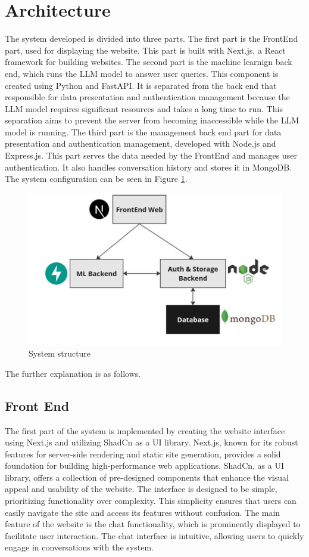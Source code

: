 \section{Architecture}
\label{sec:arsitektur}
The system developed is divided into three parts. The first part is the FrontEnd part, used for displaying the website. This part is built with Next.js, a React framework for building websites. The second part is the machine learnign back end, which runs the LLM model to answer user queries. This component is created using Python and FastAPI. It is separated from the back end that responsible for data presentation and authentication management because the LLM model requires significant resources and takes a long time to run. This separation aims to prevent the server from becoming inaccessible while the LLM model is running. The third part is the management back end part for data presentation and authentication management, developed with Node.js and Express.js. This part serves the data needed by the FrontEnd and manages user authentication. It also handles conversation history and stores it in MongoDB. The system configuration can be seen in Figure \ref*{fig:system}.

\begin{figure}
  \centering
  \includegraphics[width=.6\textwidth]{gambar/struktur-sistem.jpg}
  \caption{System structure}
  \label{fig:system}
\end{figure}

The further explanation is as follows.
\subsection{Front End}
\label{subsec:frontend}

The first part of the system is implemented by creating the website interface using Next.js and utilizing ShadCn as a UI library. Next.js, known for its robust features for server-side rendering and static site generation, provides a solid foundation for building high-performance web applications. ShadCn, as a UI library, offers a collection of pre-designed components that enhance the visual appeal and usability of the website. The interface is designed to be simple, prioritizing functionality over complexity. This simplicity ensures that users can easily navigate the site and access its features without confusion. The main feature of the website is the chat functionality, which is prominently displayed to facilitate user interaction. The chat interface is intuitive, allowing users to quickly engage in conversations with the system.

